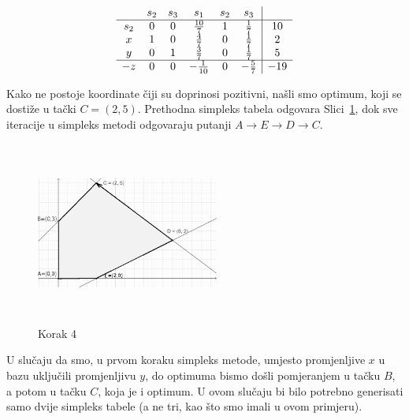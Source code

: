 \documentclass[b5paper, utf8, 11pt, colorlinks]{book}
\theoremstyle{definition}
\begin{document}
$$\begin{array}{cccccc| c}
	& s_2  & s_3   & s_1  & s_2 & s_3 &     \\ \hline
	s_2 &  0   &  0    & \frac{10}{7}    &  1   & \frac{1}{7}   & 10 \\
	x   &  1   &  0    &  \frac{4}{7}    &  0   & \frac{1}{7}  & 2 \\
	y   &  0   &  1    &  \frac{3}{7}    &  0   & \frac{1}{7}   & 5  \\ \hline
	-z  &  0   &  0   &   -\frac{1}{10}  & 0    &  -\frac{5}{7} & -19 \\
\end{array}
$$ 

Kako ne postoje koordinate čiji su doprinosi pozitivni, našli smo optimum, koji se dostiže u tački $C=(2,5)$. Prethodna simpleks tabela odgovara Slici~\ref{fig:step-4}, dok sve iteracije u simpleks metodi odgovaraju putanji $A \rightarrow E \rightarrow D \rightarrow C$. 

\begin{figure}[H]
	\centering
	\includegraphics[width=170pt, height=170pt]{simpleks-primjer-2-sl4.eps}
	\caption{Korak 4}
	\label{fig:step-4}
\end{figure}


U slučaju da smo, u prvom koraku simpleks metode, umjesto promjenljive $x$ u bazu uključili promjenljivu $y$, do optimuma bismo došli pomjeranjem u tačku $B$, a potom u tačku $C$, koja je i optimum. U ovom slučaju bi bilo potrebno generisati samo dvije simpleks tabele (a ne tri, kao što smo imali u ovom primjeru).
\\
\end{document}
